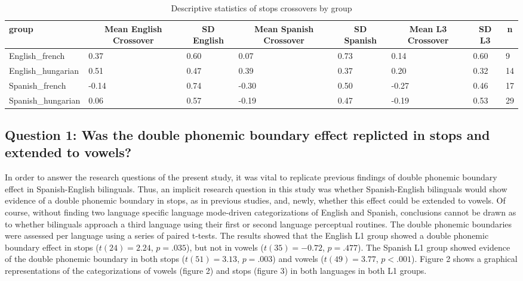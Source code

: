 \documentclass[
  man]{apa6}
\begin{document}
\begin{table}[tbp]

\begin{center}
\begin{threeparttable}

\caption{\label{tab:unnamed-chunk-4}Descriptive statistics of stops crossovers by group}

\begin{tabular}{llllllll}
\toprule
group & \multicolumn{1}{c}{Mean English Crossover} & \multicolumn{1}{c}{SD English} & \multicolumn{1}{c}{Mean Spanish Crossover} & \multicolumn{1}{c}{SD Spanish} & \multicolumn{1}{c}{Mean L3 Crossover} & \multicolumn{1}{c}{SD L3} & \multicolumn{1}{c}{n}\\
\midrule
English\_french & 0.37 & 0.60 & 0.07 & 0.73 & 0.14 & 0.60 & 9\\
English\_hungarian & 0.51 & 0.47 & 0.39 & 0.37 & 0.20 & 0.32 & 14\\
Spanish\_french & -0.14 & 0.74 & -0.30 & 0.50 & -0.27 & 0.46 & 17\\
Spanish\_hungarian & 0.06 & 0.57 & -0.19 & 0.47 & -0.19 & 0.53 & 29\\
\bottomrule
\end{tabular}

\end{threeparttable}
\end{center}

\end{table}

\hypertarget{question-1-was-the-double-phonemic-boundary-effect-replicted-in-stops-and-extended-to-vowels}{%
\subsection{Question 1: Was the double phonemic boundary effect replicted in stops and extended to vowels?}\label{question-1-was-the-double-phonemic-boundary-effect-replicted-in-stops-and-extended-to-vowels}}

In order to answer the research questions of the present study, it was vital to replicate previous findings of double phonemic boundary effect in Spanish-English bilinguals. Thus, an implicit research question in this study was whether Spanish-English bilinguals would show evidence of a double phonemic boundary in stops, as in previous studies, and, newly, whether this effect could be extended to vowels. Of course, without finding two language specific language mode-driven categorizations of English and Spanish, conclusions cannot be drawn as to whether bilinguals approach a third language using their first or second language perceptual routines. The double phonemic boundaries were assessed per language using a series of paired t-tests. The results showed that the English L1 group showed a double phonemic boundary effect in stops (\(t(24) = 2.24\), \(p = .035\)), but not in vowels (\(t(35) = -0.72\), \(p = .477\)). The Spanish L1 group showed evidence of the double phonemic boundary in both stops (\(t(51) = 3.13\), \(p = .003\)) and vowels (\(t(49) = 3.77\), \(p < .001\)). Figure 2 shows a graphical representations of the categorizations of vowels (figure 2) and stops (figure 3) in both languages in both L1 groups.
\end{document}
